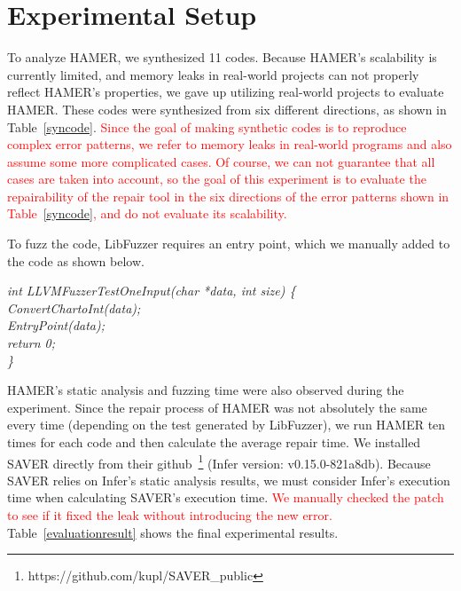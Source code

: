 \documentclass[a4paper,11pt,oneside,openany]{book}
\begin{document}
\section{Experimental Setup}
To analyze HAMER, we synthesized 11 codes. Because HAMER's scalability is currently limited, and memory leaks in real-world projects can not properly reflect HAMER's properties, we gave up utilizing real-world projects to evaluate HAMER. These codes were synthesized from six different directions, as shown in Table~\ref{syncode}. \textcolor{red}{Since the goal of making synthetic codes is to reproduce complex error patterns, we refer to memory leaks in real-world programs and also assume some more complicated cases. Of course, we can not guarantee that all cases are taken into account, so the goal of this experiment is to evaluate the repairability of the repair tool in the six directions of the error patterns shown in Table~\ref{syncode}, and do not evaluate its scalability.} 

To fuzz the code, LibFuzzer requires an entry point, which we manually added to the code as shown below. 

\begin{minipage}{\textwidth}
    \vspace{0.2cm}
    \textsl{\hspace{0.3cm}int LLVMFuzzerTestOneInput(char *data, int size) \{\\\hspace{0.6cm}ConvertChartoInt(data);\\\hspace{0.6cm}EntryPoint(data);\\\hspace{0.6cm}return 0;\\\hspace{0.3cm}\}}
    \vspace{0.2cm}
\end{minipage}
HAMER's static analysis and fuzzing time were also observed during the experiment. Since the repair process of HAMER was not absolutely the same every time (depending on the test generated by LibFuzzer), we run HAMER ten times for each code and then calculate the average repair time. We installed SAVER directly from their github~\footnote{https://github.com/kupl/SAVER\_public} (Infer version: v0.15.0-821a8db). Because SAVER relies on Infer's static analysis results, we must consider Infer's execution time when calculating SAVER's execution time. \textcolor{red}{We manually checked the patch to see if it fixed the leak without introducing the new error.} Table~\ref{evaluationresult} shows the final experimental results.
\end{document}
